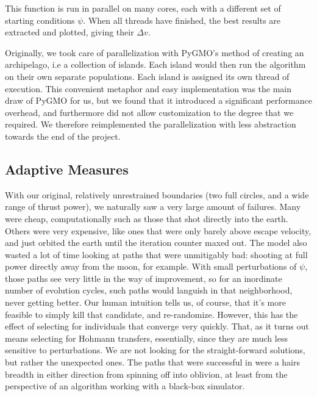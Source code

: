 This function is run in parallel on many cores, each with a different set of starting conditions \(\psi\). When all threads have finished, the best results are extracted and plotted, giving their \(\Delta v\).

Originally, we took care of parallelization with PyGMO's method of creating an archipelago, i.e a collection of islands. Each island would then run the algorithm on their own separate populations. Each island is assigned its own thread of execution. This convenient metaphor and easy implementation was the main draw of PyGMO for us, but we found that it introduced a significant performance overhead, and furthermore did not allow customization to the degree that we required. We therefore reimplemented the parallelization with less abstraction towards the end of the project.

\subsection{Adaptive Measures}
With our original, relatively unrestrained boundaries (two full circles, and a wide range of thrust power), we naturally saw a very large amount of failures. Many were cheap, computationally such as those that shot directly into the earth. Others were very expensive, like ones that were only barely above escape velocity, and just orbited the earth until the iteration counter maxed out. The model also wasted a lot of time looking at paths that were unmitigably bad: shooting at full power directly away from the moon, for example. With small perturbations of $\psi$, those paths see very little in the way of improvement, so for an inordinate number of evolution cycles, such paths would languish in that neighborhood, never getting better. Our human intuition tells us, of course, that it's more feasible to simply kill that candidate, and re-randomize. However, this has the effect of selecting for individuals that converge very quickly. That, as it turns out means selecting for Hohmann transfers, essentially, since they are much less sensitive to perturbations. We are not looking for the straight-forward solutions, but rather the unexpected ones. The paths that were successful in \cite{Saxe2015} were a hairs breadth in either direction from spinning off into oblivion, at least from the perspective of an algorithm working with a black-box simulator. 


